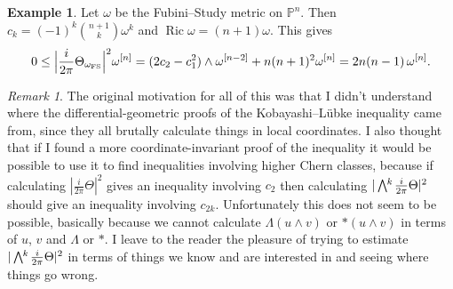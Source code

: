 \documentclass[11pt,a4paper]{amsart}
\def\^#1{^{[#1]}}
\def\bw#1{\bigwedge{}^{\mkern-5mu #1}\mkern2mu}
\DeclareMathOperator{\Ric}{Ric}
\def\PP{\mathbb{P}}
\def\curv{\frac{i}{2\pi} \Theta}
\theoremstyle{definition}
\newtheorem{exam}[theo]{Example}
\theoremstyle{remark}
\newtheorem*{rema}{Remark}
\numberwithin{equation}{section}
\begin{document}
\begin{exam}
Let $\omega$ be the Fubini--Study metric on $\PP^n$.  Then $c_k = (-1)^k
\binom{n+1}{k} \omega^k$ and $\Ric \omega = (n+1)\omega$. This gives
$$
    0 \leq
    \Bigl\lvert \curv_{\omega_{\mathrm{FS}}} \Bigr\rvert^2 \omega\^n
     = (2 c_2 - c_1^2) \wedge \omega\^{n-2} + n(n+1)^2 \omega\^{n}
    = 2n(n-1)\, \omega\^n.
$$
\end{exam}


\begin{rema}
The original motivation for all of this was that I didn't understand
where the differential-geometric proofs of the Kobayashi--L\"{u}bke
inequality came from, since they all brutally calculate things in local
coordinates. I also thought that if I found a more coordinate-invariant
proof of the inequality it would be possible to use it to find inequalities
involving higher Chern classes, because if calculating $|\curv|^2$ gives an
inequality involving $c_2$ then calculating $|\bw{k}\curv|^2$ should give
an inequality involving $c_{2k}$. Unfortunately this does not seem to be
possible, basically because we cannot calculate $\Lambda(u \wedge v)$ or
$*(u \wedge v)$ in terms of $u$, $v$ and $\Lambda$ or $*$. I leave to the
reader the pleasure of trying to estimate $|\bw{k}\curv|^2$ in terms of
things we know and are interested in and seeing where things go wrong.
\end{rema}




\end{document}
